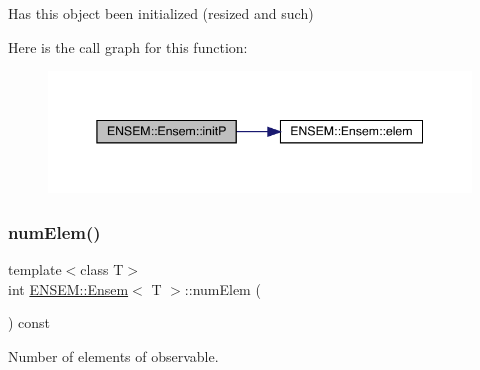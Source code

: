 Has this object been initialized (resized and such) 

Here is the call graph for this function\+:
\nopagebreak
\begin{figure}[H]
\begin{center}
\leavevmode
\includegraphics[width=345pt]{d7/d3e/classENSEM_1_1Ensem_af76aaa7b0f354006786dce06dc04669d_cgraph}
\end{center}
\end{figure}
\mbox{\label{classENSEM_1_1Ensem_a495a563176192200eca2f16978158750}} 
\subsubsection{\texorpdfstring{numElem()}{numElem()}\hspace{0.1cm}{\footnotesize\ttfamily [1/2]}}
{\footnotesize\ttfamily template$<$class T$>$ \\
int \mbox{\hyperlink{classENSEM_1_1Ensem}{E\+N\+S\+E\+M\+::\+Ensem}}$<$ T $>$\+::num\+Elem (\begin{DoxyParamCaption}{ }\end{DoxyParamCaption}) const\hspace{0.3cm}{\ttfamily [inline]}}



Number of elements of observable. 

